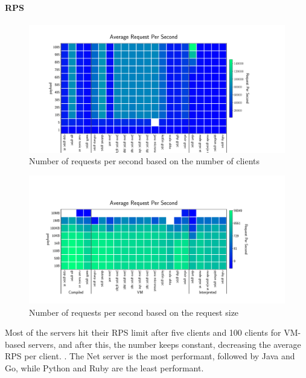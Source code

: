 \paragraph{RPS}
\begin{figure}[!hbt]
    \begin{center}
        \includegraphics[width=1.2\linewidth]{imgs/rps_clients}
    \end{center}
    \caption{Number of requests per second based on the number of clients}\label{fig:rps_clients}
\end{figure}

\begin{figure}[!hbt]
    \begin{center}
        \includegraphics[width=1.2\linewidth]{imgs/rps_payload}
    \end{center}
    \caption{Number of requests per second based on the request size}\label{fig:rps_payload}
\end{figure}
Most of the servers hit their RPS limit after five clients and 100 clients for VM-based servers, and after this, the number keeps constant, decreasing the average RPS per client.
. The Net server is the most performant, followed by Java and Go, while Python and Ruby are the least performant.

